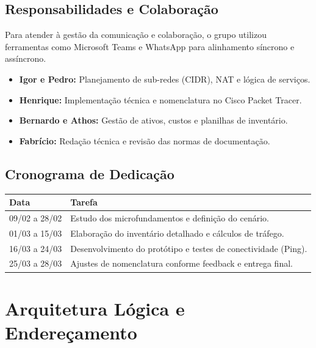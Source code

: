 \documentclass[12pt,a4paper,oneside]{report}
\begin{document}
\subsection{Responsabilidades e Colaboração}
Para atender à gestão da comunicação e colaboração, o grupo utilizou ferramentas como Microsoft Teams e WhatsApp para alinhamento síncrono e assíncrono.
\begin{itemize}[label=\color{pucblue}$\bullet$]
    \item \textbf{Igor e Pedro:} Planejamento de sub-redes (CIDR), NAT e lógica de serviços.
    \item \textbf{Henrique:} Implementação técnica e nomenclatura no Cisco Packet Tracer.
    \item \textbf{Bernardo e Athos:} Gestão de ativos, custos e planilhas de inventário.
    \item \textbf{Fabrício:} Redação técnica e revisão das normas de documentação.
\end{itemize}

\subsection{Cronograma de Dedicação}
\begin{center}
\small
\begin{tabular}{ll}
\toprule
\textbf{Data} & \textbf{Tarefa} \\ \midrule
09/02 a 28/02 & Estudo dos microfundamentos e definição do cenário. \\
01/03 a 15/03 & Elaboração do inventário detalhado e cálculos de tráfego. \\
16/03 a 24/03 & Desenvolvimento do protótipo e testes de conectividade (Ping). \\
25/03 a 28/03 & Ajustes de nomenclatura conforme feedback e entrega final. \\ \bottomrule
\end{tabular}
\end{center}

\section{Arquitetura Lógica e Endereçamento}
\end{document}
